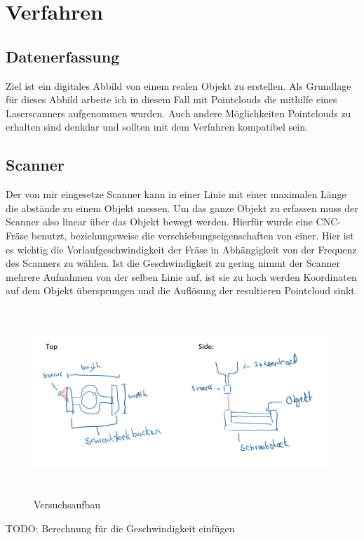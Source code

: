 \documentclass[../main.tex]{subfiles}
\begin{document}
\section{Verfahren}

\subsection{Datenerfassung}
Ziel ist ein digitales Abbild von einem realen Objekt zu erstellen.
Als Grundlage für dieses Abbild arbeite ich in diesem Fall mit Pointclouds 
die mithilfe eines Laserscanners aufgenommen wurden. Auch andere Möglichkeiten
Pointclouds zu erhalten sind denkdar und sollten mit dem Verfahren 
kompatibel sein.

\subsection{Scanner}
Der von mir eingesetze Scanner kann in einer Linie mit einer maximalen Länge 
die abstände zu einem Objekt messen.
Um das ganze Objekt zu erfassen muss der Scanner also linear über das Objekt 
bewegt werden. 
Hierfür wurde eine CNC-Fräse benutzt, beziehungsweise die 
verschiebungseigenschaften von einer.
Hier ist es wichtig die Vorlaufgeschwindigkeit der Fräse in Abhängigkeit von der
Frequenz des Scanners zu wählen. 
Ist die Geschwindigkeit zu gering nimmt der Scanner mehrere Aufnahmen von der
selben Linie auf, ist sie zu hoch werden Koordinaten auf dem Objekt übersprungen
und die Auflösung der resultieren Pointcloud sinkt.
\begin{figure}[h]
    \centering
    \includegraphics[height=200pt]{images/versuchsaufbau_sketch.PNG}
    \caption{Versuchsaufbau}
    \label{fig:versuchsaufbau}
\end{figure}


TODO: Berechnung für die Geschwindigkeit einfügen
\end{document}
